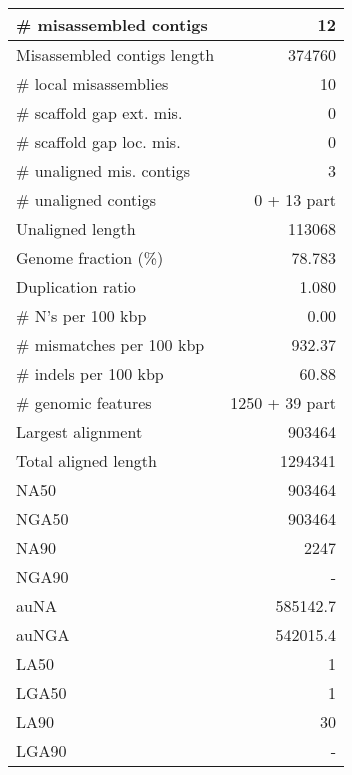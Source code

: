 \documentclass[12pt,a4paper]{article}
\begin{document}
\begin{table}[ht]
\begin{center}
\begin{tabular}{|l*{1}{|r}|}
\# misassembled contigs & 12 \\ \hline
Misassembled contigs length & 374760 \\ \hline
\# local misassemblies & 10 \\ \hline
\# scaffold gap ext. mis. & 0 \\ \hline
\# scaffold gap loc. mis. & 0 \\ \hline
\# unaligned mis. contigs & 3 \\ \hline
\# unaligned contigs & 0 + 13 part \\ \hline
Unaligned length & 113068 \\ \hline
Genome fraction (\%) & 78.783 \\ \hline
Duplication ratio & 1.080 \\ \hline
\# N's per 100 kbp & 0.00 \\ \hline
\# mismatches per 100 kbp & 932.37 \\ \hline
\# indels per 100 kbp & 60.88 \\ \hline
\# genomic features & 1250 + 39 part \\ \hline
Largest alignment & 903464 \\ \hline
Total aligned length & 1294341 \\ \hline
NA50 & 903464 \\ \hline
NGA50 & 903464 \\ \hline
NA90 & 2247 \\ \hline
NGA90 & - \\ \hline
auNA & 585142.7 \\ \hline
auNGA & 542015.4 \\ \hline
LA50 & 1 \\ \hline
LGA50 & 1 \\ \hline
LA90 & 30 \\ \hline
LGA90 & - \\ \hline
\end{tabular}
\end{center}
\end{table}
\end{document}

